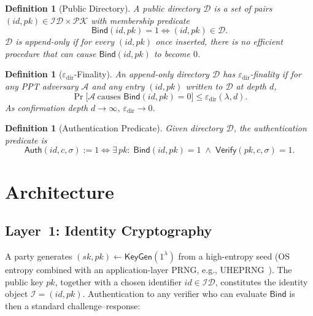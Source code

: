 \documentclass[11pt,a4paper]{article}
\newtheorem{definition}[theorem]{Definition}
\begin{document}
\begin{definition}[Public Directory]
  \label{def:directory}
  A \emph{public directory} $\mathcal{D}$ is a set of pairs $(id, pk) \in
  \mathcal{ID} \times \mathcal{PK}$ with membership predicate
  \[
    \mathsf{Bind}(id, pk) = 1 \iff (id, pk) \in \mathcal{D}.
  \]
  $\mathcal{D}$ is \emph{append-only} if for every $(id, pk)$ once inserted,
  there is no efficient procedure that can cause $\mathsf{Bind}(id, pk)$ to
  become $0$.
\end{definition}

\begin{definition}[$\varepsilon_{\mathrm{dir}}$-Finality]
  \label{def:finality}
  An append-only directory $\mathcal{D}$ has \emph{$\varepsilon_{\mathrm{dir}}$-finality}
  if for any PPT adversary $\mathcal{A}$ and any entry $(id, pk)$ written to
  $\mathcal{D}$ at depth $d$,
  \[
    \Pr\bigl[\mathcal{A}\ \text{causes } \mathsf{Bind}(id,pk) = 0\bigr]
    \leq \varepsilon_{\mathrm{dir}}(\lambda, d).
  \]
  As confirmation depth $d \to \infty$, $\varepsilon_{\mathrm{dir}} \to 0$.
\end{definition}

\begin{definition}[Authentication Predicate]
  \label{def:auth}
  Given directory $\mathcal{D}$, the \emph{authentication predicate} is
  \[
    \mathsf{Auth}(id, c, \sigma) := 1 \iff
    \exists\, pk :\;
    \mathsf{Bind}(id, pk) = 1
    \;\wedge\;
    \mathsf{Verify}(pk, c, \sigma) = 1.
  \]
\end{definition}

\section{Architecture}
\label{sec:architecture}

\subsection{Layer~1: Identity Cryptography}
\label{sec:arch:layer1}

A party generates $(sk, pk) \gets \mathsf{KeyGen}(1^\lambda)$ from a
high-entropy seed (OS entropy combined with an application-layer PRNG, e.g.,
UHEPRNG~\cite{uheprng}).  The public key $pk$, together with a chosen
identifier $id \in \mathcal{ID}$, constitutes the identity object
$\mathcal{I} = (id, pk)$.  Authentication to any verifier who can evaluate
$\mathsf{Bind}$ is then a standard challenge--response:
\end{document}
